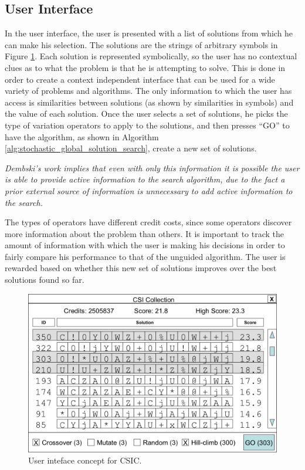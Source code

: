 \subsection{User Interface}

In the user interface, the user is presented with a list of solutions from which he can make his selection.  The solutions are the strings of arbitrary symbols in Figure \ref{fig:CSIC_UI}.  Each solution is represented symbolically, so the user has no contextual clues as to what the problem is that he is attempting to solve.  This is done in order to create a context independent interface that can be used for a wide variety of problems and algorithms. The only information to which the user has access is similarities between solutions (as shown by similarities in symbols) and the value of each solution. Once the user selects a set of solutions, he picks the type of variation operators to apply to the solutions, and then presses ``GO'' to have the algorithm, as shown in Algorithm \ref{alg:stochastic_global_solution_search}, create a new set of solutions.

 \emph{ Dembski's work implies that even with only this information it is possible the user is able to provide active information to the search algorithm, due to the fact a prior external source of information is unnecessary to add active information to the search.}    

The types of operators have different credit costs, since some operators discover more information about the problem than others. It is important to track the amount of information with which the user is making his decisions in order to fairly compare his performance to that of the unguided algorithm.  The user is rewarded based on whether this new set of solutions improves over the best solutions found so far.  

\begin{figure}[!t]
  \centering
  \includegraphics[width=4.5in]{HollowayCSICUI2}
  \caption{User inteface concept for CSIC.}
  \label{fig:CSIC_UI}
\end{figure}

